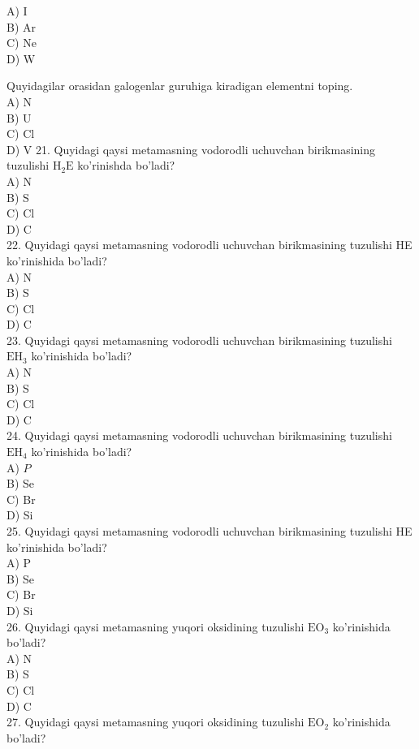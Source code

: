 A) I\\
B) Ar\\
C) Ne\\
D) W
  \item Quyidagilar orasidan galogenlar guruhiga kiradigan elementni toping.\\
A) N\\
B) U\\
C) Cl\\
D) V
21. Quyidagi qaysi metamasning vodorodli uchuvchan birikmasining tuzulishi $\mathrm{H}_{2} \mathrm{E}$ ko'rinishda bo'ladi?\\
A) N\\
B) S\\
C) Cl\\
D) C\\
22. Quyidagi qaysi metamasning vodorodli uchuvchan birikmasining tuzulishi HE ko'rinishida bo'ladi?\\
A) N\\
B) S\\
C) Cl\\
D) C\\
23. Quyidagi qaysi metamasning vodorodli uchuvchan birikmasining tuzulishi $\mathrm{EH}_{3}$ ko'rinishida bo'ladi?\\
A) N\\
B) S\\
C) Cl\\
D) C\\
24. Quyidagi qaysi metamasning vodorodli uchuvchan birikmasining tuzulishi $\mathrm{EH}_{4}$ ko'rinishida bo'ladi?\\
A) $P$\\
B) Se\\
C) Br\\
D) Si\\
25. Quyidagi qaysi metamasning vodorodli uchuvchan birikmasining tuzulishi HE ko'rinishida bo'ladi?\\
A) P\\
B) Se\\
C) Br\\
D) Si\\
26. Quyidagi qaysi metamasning yuqori oksidining tuzulishi $\mathrm{EO}_{3}$ ko'rinishida bo'ladi?\\
A) N\\
B) S\\
C) Cl\\
D) C\\
27. Quyidagi qaysi metamasning yuqori oksidining tuzulishi $\mathrm{EO}_{2}$ ko'rinishida bo'ladi?\\
